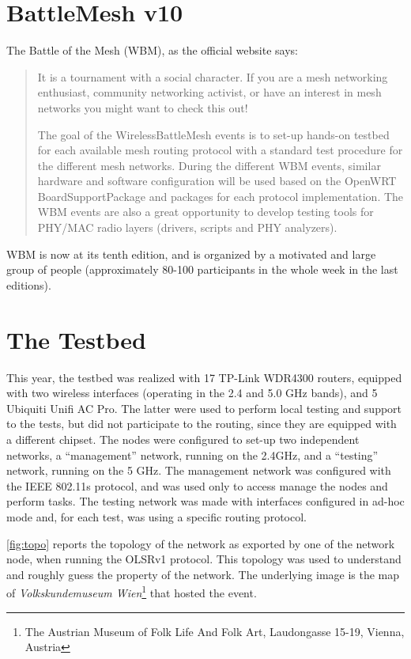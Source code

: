 \documentclass[10pt,onecolumn]{paper}
\begin{document}
\section{BattleMesh v10}
The Battle of the Mesh (WBM), as the official website says:
\begin{quote}
It is a tournament with a social character. If you are a mesh networking
enthusiast, community networking activist, or have an interest in mesh networks
you might want to check this out!

The goal of the WirelessBattleMesh events is to set-up hands-on testbed for each
available mesh routing protocol with a standard test procedure for the different
mesh networks. During the different WBM events, similar hardware and software
configuration will be used based on the OpenWRT BoardSupportPackage and packages
for each protocol implementation. The WBM events are also a great opportunity to
develop testing tools for PHY/MAC radio layers (drivers, scripts and PHY
analyzers).
\end{quote}

WBM is now at its tenth edition, and is organized by a motivated and large group
of people (approximately 80-100 participants in the whole week in the last
editions). 

\section{The Testbed}
This year, the testbed was realized with 17 TP-Link WDR4300 routers, equipped
with two wireless interfaces (operating in the 2.4 and 5.0 GHz bands), and 5
Ubiquiti Unifi AC Pro. The latter were used to perform local testing and support
to the tests, but did not participate to the routing, since they are equipped
with a different chipset. The nodes were configured to set-up two independent
networks, a ``management'' network, running on the 2.4GHz, and a ``testing''
network, running on the 5 GHz. The management network was configured with the
IEEE 802.11s protocol, and was used only to access manage the nodes and perform
tasks. The testing network was made with interfaces configured in ad-hoc mode
and, for each test, was using a specific routing protocol. 

\cref{fig:topo} reports the topology of the network as exported by one of the
network node, when running the OLSRv1 protocol. This topology was used to
understand and roughly guess the property of the network. The underlying image
is the map of \textit{Volkskundemuseum Wien}\footnote{The Austrian Museum of
Folk Life And Folk Art, Laudongasse 15-19, Vienna, Austria}
that hosted the event.
\end{document}
